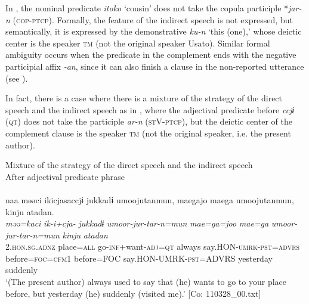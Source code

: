 In , the nominal predicate \textit{itoko} ‘cousin’ does not take the copula participle *\textit{jar-n} (\textsc{cop}-\textsc{ptcp}). Formally, the feature of the indirect speech is not expressed, but semantically, it is expressed by the demonstrative \textit{ku-n} ‘this (one),’ whose deictic center is the speaker \textsc{tm} (not the original speaker Usato). Similar formal ambiguity occurs when the predicate in the complement ends with the negative participial affix \textit{{}-an}, since it can also finish a clause in the non-reported utterance (see ).

  In fact, there is a case where there is a mixture of the strategy of the direct speech and the indirect speech as in , where the adjectival predicate before \textit{ccjɨ} (\textsc{qt}) does not take the participle \textit{ar-n} (\textsc{st}V-\textsc{ptcp}), but the deictic center of the complement clause is the speaker \textsc{tm} (not the original speaker, i.e. the present author).

\ea\label{ex:10.65}   Mixture of the strategy of the direct speech and the indirect speech\\
  After adjectival predicate phrase\\\\
      \glll    naa  məəci  ikicjasaccjɨ  jukkadɨ  umoojutanmun,  {\textbar}mae{\textbar}gajo  {\textbar}mae{\textbar}ga  umoojutanmun,  kinju  atadan.\\                                                                                                                                                     
    \textit{}  \textit{məə=kaci}  \textit{ik-i+cja-}  \textit{jukkadɨ}  \textit{umoor-jur-tar-n=mun}  \textit{mae=ga=joo}  \textit{mae=ga} \textit{umoor-jur-tar-n=mun}  \textit{kinju}  \textit{atadan}\\                                                                                                                                                     
    2.\textsc{hon}.\textsc{sg}.\textsc{adnz}  place=\textsc{all}  go-\textsc{inf}+want-\textsc{adj}=\textsc{qt}  always   say.HON-\textsc{umrk}-\textsc{pst}=\textsc{advrs}  before=\textsc{foc}=\textsc{cfm}1  before=FOC   say.HON-UMRK-\textsc{pst}=ADVRS  yesterday  suddenly\\
    \glt ‘(The present author) always used to say that (he) wants to go to your place before, but yesterday (he) suddenly (visited me).’ [Co: 110328\_00.txt]
\z

